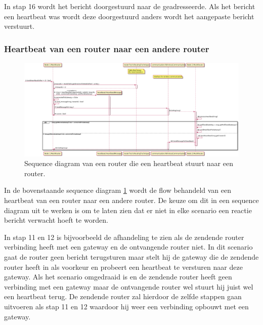 \documentclass[a4paper, 11pt, oneside]{report}
\begin{document}
In stap 16 wordt het bericht doorgestuurd naar de geadresseerde.
Als het bericht een heartbeat was wordt deze doorgestuurd anders wordt het aangepaste bericht verstuurt.

\subsubsection{Heartbeat van een router naar een andere router}
\label{DetailedDesign:Communicatie:sequence:heartbeatrouter->router}
\begin{figure}[H]
	\begin{center}\includegraphics[width=\linewidth]{UML/out/Communication/Sequence/RouterHeartbeatRouter/RouterHeartbeatRouter.png}\end{center}
	\caption{Sequence diagram van een router die een heartbeat stuurt naar een router.}
	\label{fig:communication:sequence:sequence:router->router}
\end{figure}
In de bovenstaande sequence diagram \ref{fig:communication:sequence:sequence:router->router} wordt de flow behandeld van een heartbeat van een router naar een andere router.
De keuze om dit in een sequence diagram uit te werken is om te laten zien dat er niet in elke scenario een reactie bericht verwacht hoeft te worden.

In stap 11 en 12 is bijvoorbeeld de afhandeling te zien als de zendende router verbinding heeft met een gateway en de ontvangende router niet.
In dit scenario gaat de router geen bericht terugsturen maar stelt hij de gateway die de zendende router heeft in als voorkeur en probeert een heartbeat te versturen naar deze gateway.    
Als het scenario omgedraaid is en de zendende router heeft geen verbinding met een gateway maar de ontvangende router wel stuurt hij juist wel een heartbeat terug. 
De zendende router zal hierdoor de zelfde stappen gaan uitvoeren als stap 11 en 12 waardoor hij weer een verbinding opbouwt met een gateway.
\end{document}
